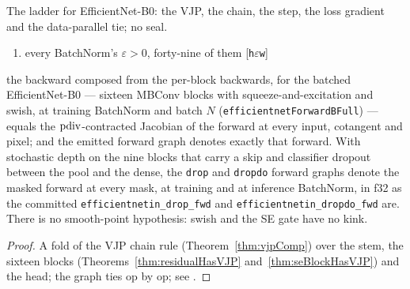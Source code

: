 The ladder for EfficientNet-B0: the VJP, the chain, the step, the loss
gradient and the data-parallel tie; no seal.

\begin{theorem}
  \label{thm:efficientnetFullHasVJP}
  \leanok
  \Assume{}
  \begin{enumerate}
    \item every BatchNorm's \(\varepsilon > 0\), forty-nine of them
          \hfill[\texttt{h\(\varepsilon\)w}]
  \end{enumerate}
  \Prove{} the backward composed from the per-block backwards, for the
  batched EfficientNet-B0 --- sixteen MBConv blocks with
  squeeze-and-excitation and swish, at training BatchNorm and batch \(N\)
  (\texttt{efficientnetForwardBFull}) --- equals the \(\operatorname{pdiv}\)-contracted
  Jacobian of the forward at every input, cotangent and pixel; and the
  emitted forward graph denotes exactly that forward. With stochastic depth
  on the nine blocks that carry a skip and classifier dropout between the
  pool and the dense, the \texttt{drop} and \texttt{dropdo} forward graphs
  denote the masked forward at every mask, at training and at inference
  BatchNorm, in f32 as the committed \texttt{efficientnetin\_drop\_fwd} and
  \texttt{efficientnetin\_dropdo\_fwd} are. There is no smooth-point
  hypothesis: swish and the SE gate have no kink.
\end{theorem}

\begin{proof}
\leanok
A fold of the VJP chain rule (Theorem~\ref{thm:vjpComp}) over the stem, the
sixteen blocks (Theorems~\ref{thm:residualHasVJP} and~\ref{thm:seBlockHasVJP})
and the head; the graph ties op by op; see
.
\end{proof}

